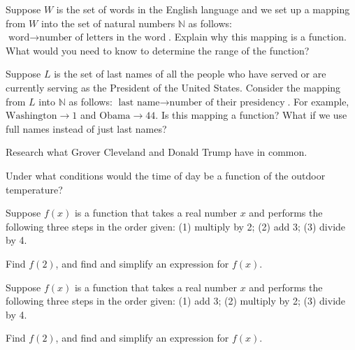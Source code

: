 \documentclass{ximera}
\begin{document}






\begin{problem} 
Suppose $W$ is the set of words in the English language and we set up a mapping from $W$ into the set of natural numbers $\mathbb{N}$ as follows: $\text{word} \rightarrow \text{number of letters in the word}$.  Explain why this mapping is a function.  What would you need to know to determine the range of the function?
\end{problem}

\begin{problem}
    Suppose $L$ is the set of last names of all the people who have served or are currently serving as the President of the United States.   Consider the mapping from $L$ into $\mathbb{N}$ as follows:  $\text{last name} \rightarrow \text{number of their presidency}$.  For example,  $\text{Washington} \rightarrow 1$ and $\text{Obama} \rightarrow 44$.  Is this mapping a function?  What if we use full names instead of just last names?
    \begin{hint}
    Research what Grover Cleveland and Donald Trump have in common.
    \end{hint}
\end{problem} 

\begin{problem}
  Under what conditions would the time of day be a function of the outdoor temperature?   
\end{problem}





\begin{problem}\label{buildfunctionfirst}
    Suppose $f(x)$ is a function that takes a real number $x$ and performs the following three steps in the order given:   (1) multiply by 2; (2) add 3; (3) divide by 4. 

    Find $f(2)$, and find and simplify an expression for $f(x)$.
\end{problem}


\begin{problem}
    Suppose $f(x)$ is a function that takes a real number $x$ and performs the following three steps in the order given:    (1) add 3; (2) multiply by 2; (3) divide by 4. 

    Find $f(2)$, and find and simplify an expression for $f(x)$.
\end{problem}
\end{document}
